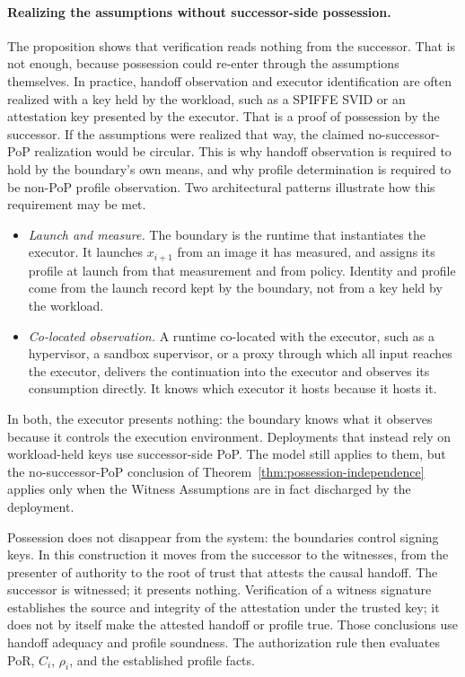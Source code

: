 \documentclass[10pt,twocolumn]{article}
\begin{document}
\paragraph{Realizing the assumptions without successor-side possession.}
The proposition shows that verification reads nothing from the successor. That
is not enough, because possession could re-enter through the assumptions
themselves. In practice, handoff observation and executor identification are
often realized with a key held by the workload, such as a SPIFFE SVID or an
attestation key presented by the executor. That is a proof of possession by the
successor. If the assumptions were realized that way, the claimed
no-successor-PoP realization would be circular. This is why handoff observation
is required to hold by the
boundary's own means, and why profile determination is required to be non-PoP
profile observation. Two architectural patterns illustrate how this requirement
may be met.
\begin{itemize}
    \item \emph{Launch and measure.} The boundary is the runtime that
    instantiates the executor. It launches \(x_{i+1}\) from an image it has
    measured, and assigns its profile at launch from that measurement and from
    policy. Identity and profile come from the launch record kept by the
    boundary, not from a key held by the workload.
    \item \emph{Co-located observation.} A runtime co-located with the
    executor, such as a hypervisor, a sandbox supervisor, or a proxy through
    which all input reaches the executor, delivers the continuation into the
    executor and observes its consumption directly. It knows which executor it
    hosts because it hosts it.
\end{itemize}
In both, the executor presents nothing: the boundary knows what it observes
because it controls the execution environment. Deployments that instead rely on
workload-held keys use successor-side PoP. The model still applies to them, but
the no-successor-PoP conclusion of
Theorem~\ref{thm:possession-independence} applies only when the Witness
Assumptions are in fact discharged by the deployment.

Possession does not disappear from the system: the boundaries control signing
keys. In this construction it moves from the successor to the witnesses, from
the presenter of authority to the root of trust that attests the causal
handoff. The successor is witnessed; it presents nothing. Verification of a
witness signature establishes the source and integrity of the attestation under
the trusted key; it does not by itself make the attested handoff or profile
true. Those conclusions use handoff adequacy and profile soundness. The
authorization rule then evaluates PoR, \(C_i\), \(\rho_i\), and the established
profile facts.
\end{document}
